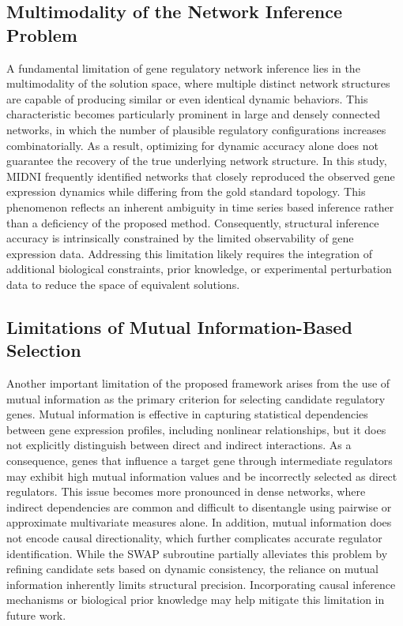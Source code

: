 \subsection{Multimodality of the Network Inference Problem}
A fundamental limitation of gene regulatory network inference lies in the multimodality of the solution space, where multiple distinct network structures are capable of producing similar or even identical dynamic behaviors. This characteristic becomes particularly prominent in large and densely connected networks, in which the number of plausible regulatory configurations increases combinatorially. As a result, optimizing for dynamic accuracy alone does not guarantee the recovery of the true underlying network structure. In this study, MIDNI frequently identified networks that closely reproduced the observed gene expression dynamics while differing from the gold standard topology. This phenomenon reflects an inherent ambiguity in time series based inference rather than a deficiency of the proposed method. Consequently, structural inference accuracy is intrinsically constrained by the limited observability of gene expression data. Addressing this limitation likely requires the integration of additional biological constraints, prior knowledge, or experimental perturbation data to reduce the space of equivalent solutions.
\subsection{Limitations of Mutual Information-Based Selection}
Another important limitation of the proposed framework arises from the use of mutual information as the primary criterion for selecting candidate regulatory genes. Mutual information is effective in capturing statistical dependencies between gene expression profiles, including nonlinear relationships, but it does not explicitly distinguish between direct and indirect interactions. As a consequence, genes that influence a target gene through intermediate regulators may exhibit high mutual information values and be incorrectly selected as direct regulators. This issue becomes more pronounced in dense networks, where indirect dependencies are common and difficult to disentangle using pairwise or approximate multivariate measures alone. In addition, mutual information does not encode causal directionality, which further complicates accurate regulator identification. While the SWAP subroutine partially alleviates this problem by refining candidate sets based on dynamic consistency, the reliance on mutual information inherently limits structural precision. Incorporating causal inference mechanisms or biological prior knowledge may help mitigate this limitation in future work.
